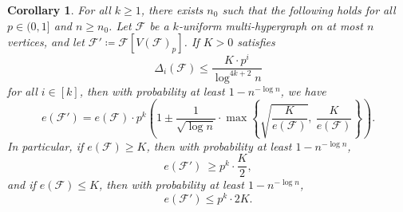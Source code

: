\documentclass[11pt]{article}
\def\COMMENT#1{}
\numberwithin{equation}{section}
\newcounter{i}
\theoremstyle{plain}
\newtheorem{cor}[thm]{Corollary}
\theoremstyle{plain} %
\theoremstyle{definition}
\newcommand{\cF}{\mathcal{F}}
\begin{document}
\begin{cor}\label{cor:KimVu} 
For all $k \geq 1$, there exists $n_0$ such that the following holds for all $p \in (0, 1]$ and $n\ge n_0$.
Let $\cF$ be a $k$-uniform multi-hypergraph on at most $n$ vertices, and let $\cF' \coloneqq \cF[V(\cF)_p]$.
If $K > 0$ satisfies
\begin{equation*}
    \Delta_i(\cF) \leq \frac{K\cdot p^i}{\log^{4k+2}n}
\end{equation*}
for all $i \in [k]$, then with probability at least $1 - n^{-\log n}$, we have
\begin{equation*}
    e(\cF') = e(\cF)\cdot p^k\left(1 \pm \frac{1}{\sqrt{\log n}}\cdot \max\left\{\sqrt{\frac{K}{e(\cF)}},~\frac{K}{e(\cF)}\right\}\right).%
\end{equation*}
In particular, if $e(\cF)\ge K$, then with probability at least $1-n^{-\log n}$,
$$e(\cF')\ \ge p^k \cdot \frac{K}{2},$$
and if $e(\cF)\le K$, then with probability at least $1-n^{-\log n}$,
$$e(\cF')\le p^k \cdot 2K.$$
\end{cor}%
\end{document}
